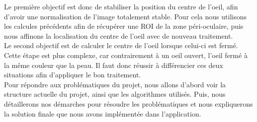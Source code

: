Le première objectif est donc de stabiliser la position du centre de l'oeil, afin d'avoir une normalisation de l'image
totalement stable. Pour cela nous utilisons les calcules précédents afin de récupérer une ROI de la zone péri-oculaire, puis
nous affinons la localisation du centre de l'oeil avec de nouveau traitement.\\

Le second objectif est de calculer le centre de l'oeil lorsque celui-ci est fermé. Cette étape est plus complexe,
car contrairement à un oeil ouvert, l'oeil fermé à la même couleur que la peau. Il faut donc réussir à différencier ces
deux situations afin d'appliquer le bon traitement.\\ 

Pour répondre aux problématiques du projet, nous allons d'abord voir la structure actuelle du projet, ainsi que les algorithmes
utilisés. Puis, nous détaillerons nos démarches pour résoudre les problématiques et nous expliquerons la solution finale que nous avons
implémentée dans l'application.

\newpage
